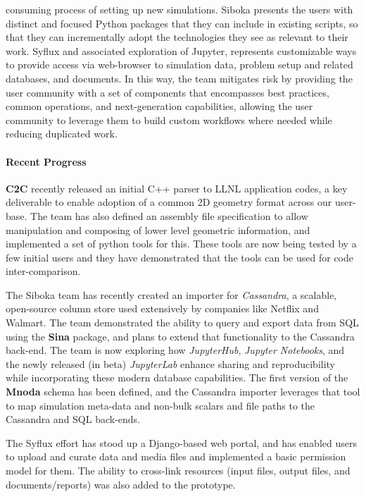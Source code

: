 consuming process of setting up new simulations.  Siboka presents the users
with distinct and focused Python packages that they can include in existing
scripts, so that they can incrementally adopt the technologies they see as
relevant to their work.  Syflux and associated exploration of Jupyter,
represents customizable ways to provide access via web-browser to simulation
data, problem setup and related databases, and documents.  In this way, the
team mitigates risk by providing the user community with a set of components
that encompasses best practices, common operations, and next-generation
capabilities, allowing the user community to leverage them to build custom
workflows where needed while reducing duplicated work.

\paragraph{Recent Progress}

\textbf{C2C} recently released an initial C++ parser to LLNL application codes,
a key deliverable to enable adoption of a common 2D geometry format across our
user-base. The team has also defined an assembly file specification to allow
manipulation and composing of lower level geometric information, and
implemented a set of python tools for this. These tools are now being tested by
a few initial users and they have demonstrated that the tools can be used for
code inter-comparison.

The Siboka team has recently created an importer for \textit{Cassandra}, a
scalable, open-source column store used extensively by companies like Netflix
and Walmart. The team demonstrated the ability to
query and export data from SQL using the \textbf{Sina} package, and plans to
extend that functionality to the Cassandra back-end. The team is now exploring
how \textit{JupyterHub}, \textit{Jupyter Notebooks}, and the newly released (in
beta) \textit{JupyterLab} enhance sharing and reproducibility while
incorporating these modern database capabilities.  The first version of the
\textbf{Mnoda} schema has been defined, and the Cassandra importer leverages
that tool to map simulation meta-data and non-bulk scalars and file paths to
the Cassandra and SQL back-ends.

The Syflux effort has stood up a Django-based web portal, and has enabled users
to upload and curate data and media files and implemented a basic permission
model for them.  The ability to cross-link resources (input files, output
files, and documents/reports) was also added to the prototype.

